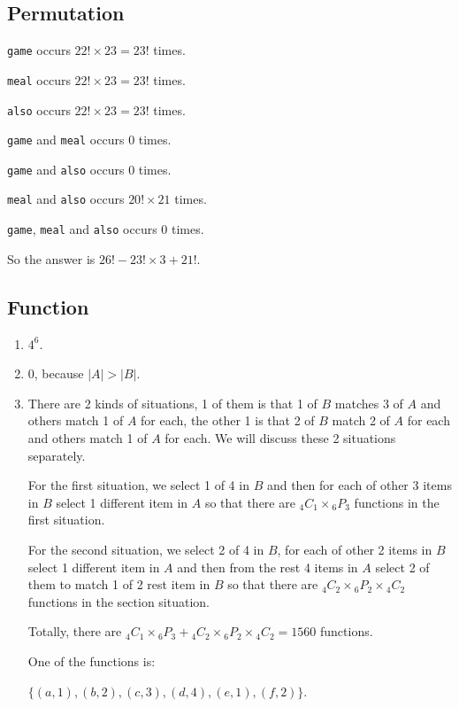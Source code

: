 \documentclass{../../cls/sig-alternate-05-2015}
\begin{document}
\subsection{Permutation}
\texttt{game} occurs $22! \times 23 = 23!$ times.

\texttt{meal} occurs $22! \times 23 = 23!$ times.

\texttt{also} occurs $22! \times 23 = 23!$ times.

\texttt{game} and \texttt{meal} occurs $0$ times.

\texttt{game} and \texttt{also} occurs $0$ times.

\texttt{meal} and \texttt{also} occurs $20! \times 21$ times.

\texttt{game}, \texttt{meal} and \texttt{also} occurs $0$ times.

So the answer is $26! - 23! \times 3 + 21!$.

\newpage

\subsection{Function}
\begin{enumerate}
	\item $4^6$.
	\item $0$, because $|A| > |B|$.
	\item There are 2 kinds of situations, 1 of them is that 1 of $B$ matches 3 of $A$ and others match 1 of $A$ for each, the other 1 is that 2 of $B$ match 2 of $A$ for each and others match 1 of $A$ for each. We will discuss these 2 situations separately.
	
	For the first situation, we select 1 of 4 in $B$ and then for each of other 3 items in $B$ select 1 different item in $A$ so that there are ${}_4 C_1 \times {}_6 P_3$ functions in the first situation.
	
	For the second situation, we select 2 of 4 in $B$, for each of other 2 items in $B$ select 1 different item in $A$ and then from the rest 4 items in $A$ select 2 of them to match 1 of 2 rest item in $B$ so that there are ${}_4 C_2 \times {}_6 P_2 \times {}_4 C_2$ functions in the section situation.
	
	Totally, there are ${}_4 C_1 \times {}_6 P_3 + {}_4 C_2 \times {}_6 P_2 \times {}_4 C_2 = 1560$ functions.
	
	One of the functions is: 
	
	$\{(a, 1), (b, 2), (c, 3), (d, 4), (e, 1), (f, 2)\}$.
\end{enumerate}
\end{document}
